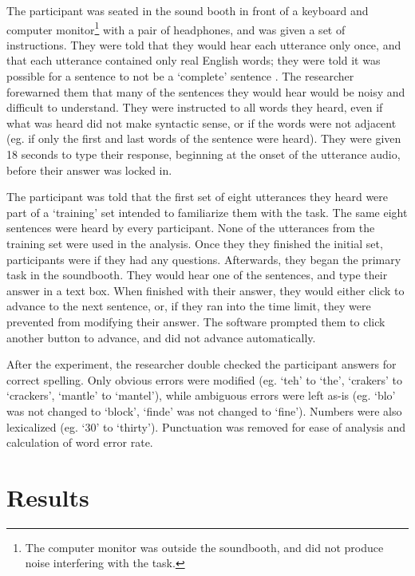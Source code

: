 The participant was seated in the sound booth in front of a keyboard and computer monitor\footnote{The computer monitor was outside the soundbooth, and did not produce noise interfering with the task.} with a pair of headphones, and was given a set of instructions. They were told that they would hear each utterance only once, and that each utterance contained only real English words; they were told it was possible for a sentence to not be a `complete' sentence \DIFaddbegin {}\DIFaddend .  The researcher forewarned them that many of the sentences they would hear would be noisy and difficult to understand. They were instructed to \DIFdelbegin {}\DIFdelend \DIFaddbegin {}\DIFaddend all words they heard, even if what was heard did not make syntactic sense, or if the words were not adjacent (eg. if only the first and last words of the sentence were heard). They were given 18 seconds to type their response, beginning at the onset of the utterance audio, before their answer was locked in.

The participant was told that the first set of eight utterances they heard were part of a `training' set intended to familiarize them with the task. The same eight sentences were heard by every participant.  None of the utterances from the training set were used in the analysis.  Once they they finished the initial set, participants were \DIFdelbegin {}\DIFdelend \DIFaddbegin {}\DIFaddend if they had any questions.  Afterwards, they began the primary task in the soundbooth.  They would hear one of the sentences, and type their answer in a text box.  When finished with their answer, they would either click to advance to the next sentence, or, if they ran into the time limit, they were prevented from modifying their answer.  The software prompted them to click another button to advance, and did not advance automatically.

After the experiment, the researcher double checked the participant answers for correct spelling.  Only obvious errors were modified (eg. `teh' to `the', `crakers' to `crackers', `mantle' to `mantel'), while ambiguous errors were left as-is (eg. `blo' was not changed to `block', `finde' was not changed to `fine').  Numbers were also lexicalized (eg. `30' to `thirty').  Punctuation was removed for ease of analysis and calculation of word error rate.


\section{Results}
\label{chap3:results}




